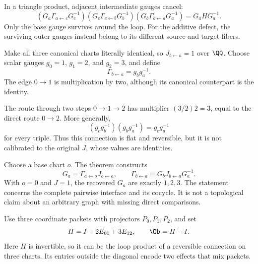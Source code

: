 In a triangle product, adjacent intermediate gauges cancel:
\[
(G_a\Gamma_{a\leftarrow c}G_c^{-1})
(G_c\Gamma_{c\leftarrow b}G_b^{-1})
(G_b\Gamma_{b\leftarrow a}G_a^{-1})
=G_aHG_a^{-1}.
\]
Only the base gauge survives around the loop. For the additive defect, the surviving outer gauges instead belong to its different source and target fibers.


Make all three canonical charts literally identical, so $J_{b\leftarrow a}=1$ over $\QQ$. Choose scalar gauges $g_0=1$, $g_1=2$, and $g_2=3$, and define
\[
\Gamma_{b\leftarrow a}=g_b g_a^{-1}.
\]
The edge $0\to1$ is multiplication by two, although its canonical counterpart is the identity.


The route through two steps $0\to1\to2$ has multiplier $(3/2)2=3$, equal to the direct route $0\to2$. More generally,
\[
(g_cg_b^{-1})(g_bg_a^{-1})=g_cg_a^{-1}
\]
for every triple. Thus this connection is flat and reversible, but it is not calibrated to the original $J$, whose values are identities.

Choose a base chart $o$. The theorem constructs
\[
G_a=\Gamma_{a\leftarrow o}J_{o\leftarrow a},
\qquad
\Gamma_{b\leftarrow a}=G_bJ_{b\leftarrow a}G_a^{-1}.
\]
With $o=0$ and $J=1$, the recovered $G_a$ are exactly $1,2,3$. The statement concerns the complete pairwise interface and its cocycle. It is not a topological claim about an arbitrary graph with missing direct comparisons.


Use three coordinate packets with projectors $P_0,P_1,P_2$, and set
\[
H=I+2E_{01}+3E_{12},\qquad \Ob=H-I.
\]
Here $H$ is invertible, so it can be the loop product of a reversible connection on three charts. Its entries outside the diagonal encode two effects that mix packets.

